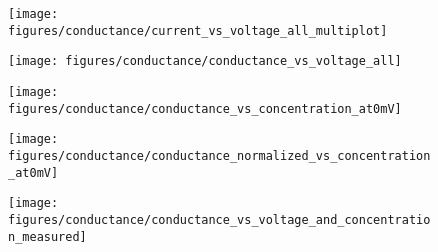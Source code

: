 \begin{figure*}[htbp]
  \centering
  \begin{subfigure}[t]{3.75cm}
    \centering
    \caption{}\vspace{-3mm}\label{fig:current-voltage_curves}
    \texttt{[image: figures/conductance/current\_vs\_voltage\_all\_multiplot]}
  \end{subfigure}
  \hspace{0.5cm}
  \begin{minipage}[t]{12cm}
    \begin{minipage}[t]{12cm}
      \begin{subfigure}[t]{4.5cm}
        \centering
        \caption{}\vspace{-3mm}\label{fig:conductance-voltage_curves}
        \texttt{[image: figures/conductance/conductance\_vs\_voltage\_all]}
      \end{subfigure}
      \hspace{0.5cm}
      \begin{minipage}[t]{6.5cm}
        \begin{subfigure}[t]{5cm}
          \centering
          \caption{}\vspace{-3mm}\label{fig:conductance-concentration_0mV_curves}
          \texttt{[image: figures/conductance/conductance\_vs\_concentration\_at0mV]}
        \end{subfigure}
        \begin{subfigure}[t]{5cm}
          \vspace*{-5mm}
          \centering
          \caption{}\vspace{-3mm}\label{fig:conductance_norm-concentration_0mV_curves}
          \texttt{[image: figures/conductance/conductance\_normalized\_vs\_concentration\_at0mV]}
        \end{subfigure}
      \end{minipage}
    \end{minipage}
    \begin{minipage}{12cm}
      \begin{subfigure}[t]{4cm}
        \centering
        \caption{}\vspace{-3mm}\label{fig:conductance_contour}
        \texttt{[image: figures/conductance/conductance\_vs\_voltage\_and\_concentration\_measured]}
      \end{subfigure}
      \hspace{5mm}
      \begin{subfigure}[t]{7cm}
        \centering

\end{subfigure}
\end{minipage}
\end{minipage}
\end{figure*}
